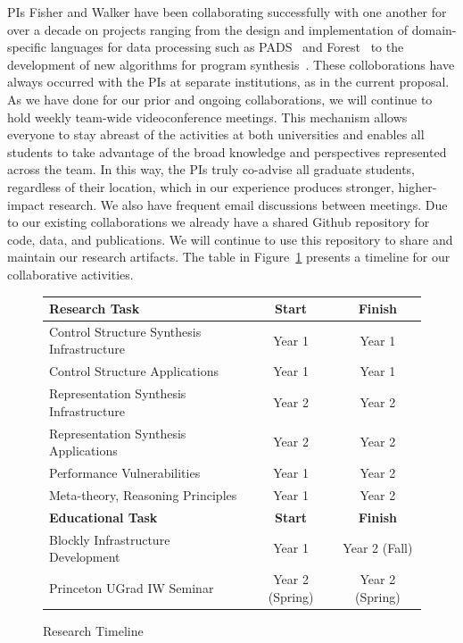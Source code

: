 PIs Fisher and Walker have been collaborating successfully
with one another for over a decade on projects ranging from the design
and implementation of domain-specific languages for data processing
such as
PADS~\cite{fisher+:next-700,fisher+:pads-overview,mandelbaum:pads-ml}
and Forest~\cite{fisher+:forest} to the development of new algorithms
for program
synthesis~\cite{fisher+:learnpads,miltner+:synthesizing-bijective-lenses,zhu+:learnpads2}.
These colloborations have always occurred with the PIs at separate
institutions, as in the current proposal.  As we have done for our
prior and ongoing collaborations, we will continue to hold weekly
team-wide videoconference meetings.  This mechanism allows everyone to
stay abreast of the activities at both universities and enables all
students to take advantage of the broad knowledge and perspectives
represented across the team.  In this way, the PIs truly co-advise all
graduate students, regardless of their location, which in our
experience produces stronger, higher-impact research.  We also have
frequent email discussions between meetings.  Due to our existing
collaborations we already have a shared Github repository for code,
data, and publications.  We will continue to use this repository to
share and maintain our research artifacts.  The table in
Figure~\ref{fig:timeline} presents a timeline for our collaborative
activities.

\begin{figure}[!hbt]
\begin{small}
\centering
\begin{tabular}{|l|c|c|}
\hline\hline
{\bf Research Task} & {\bf Start} & {\bf Finish} \\
\hline\hline
Control Structure Synthesis Infrastructure & Year 1 & Year 1\\\hline
Control Structure Applications  & Year 1& Year 1 \\\hline
Representation Synthesis Infrastructure & Year 2 & Year 2\\\hline
Representation Synthesis Applications  & Year 2 & Year 2\\\hline\hline
Performance Vulnerabilities  & Year 1 & Year 2\\\hline\hline
Meta-theory, Reasoning Principles  & Year 1 & Year 2\\\hline\hline
{\bf Educational Task} & {\bf Start} & {\bf Finish} \\\hline\hline
Blockly Infrastructure Development & Year 1 & Year 2 (Fall) \\\hline
Princeton UGrad IW Seminar & Year 2 (Spring) & Year 2 (Spring) \\\hline\hline
\end{tabular}
\end{small}
\caption{Research Timeline}\label{fig:timeline}
\end{figure} 

